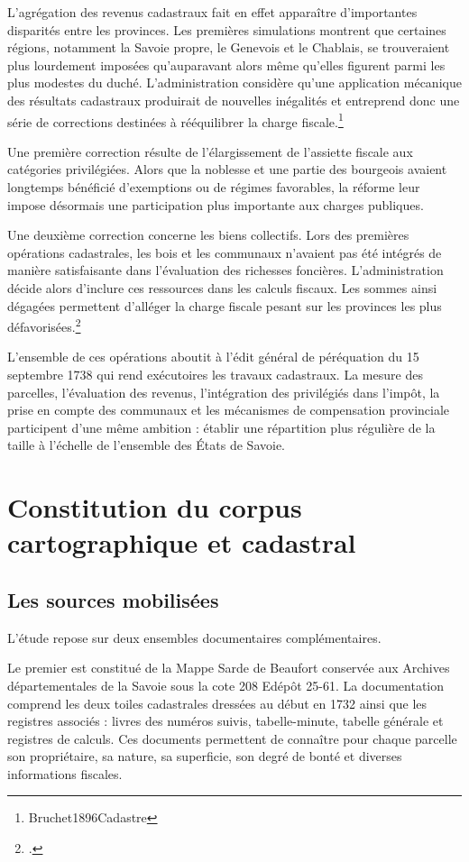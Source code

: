 \documentclass[12pt,a4paper]{report}
\begin{document}
L'agrégation des revenus cadastraux fait en effet apparaître d'importantes disparités entre les provinces. Les premières simulations montrent que certaines régions, notamment la Savoie propre, le Genevois et le Chablais, se trouveraient plus lourdement imposées qu'auparavant alors même qu'elles figurent parmi les plus modestes du duché. L'administration considère qu'une application mécanique des résultats cadastraux produirait de nouvelles inégalités et entreprend donc une série de corrections destinées à rééquilibrer la charge fiscale.\footnote{Bruchet1896Cadastre}

Une première correction résulte de l'élargissement de l'assiette fiscale aux catégories privilégiées. Alors que la noblesse et une partie des bourgeois avaient longtemps bénéficié d'exemptions ou de régimes favorables, la réforme leur impose désormais une participation plus importante aux charges publiques. 

Une deuxième correction concerne les biens collectifs. Lors des premières opérations cadastrales, les bois et les communaux n'avaient pas été intégrés de manière satisfaisante dans l'évaluation des richesses foncières. L'administration décide alors d'inclure ces ressources dans les calculs fiscaux. Les sommes ainsi dégagées permettent d'alléger la charge fiscale pesant sur les provinces les plus défavorisées.\footcite{Bruchet1896Cadastre}

L'ensemble de ces opérations aboutit à l'édit général de péréquation du 15 septembre 1738 qui rend exécutoires les travaux cadastraux. La mesure des parcelles, l'évaluation des revenus, l'intégration des privilégiés dans l'impôt, la prise en compte des communaux et les mécanismes de compensation provinciale participent d'une même ambition : établir une répartition plus régulière de la taille à l'échelle de l'ensemble des États de Savoie.
	
\chapter{Constitution du corpus cartographique et cadastral}


\section{Les sources mobilisées}

L'étude repose sur deux ensembles documentaires complémentaires.

Le premier est constitué de la Mappe Sarde de Beaufort conservée aux Archives départementales de la Savoie sous la cote 208 Edépôt 25-61. La documentation comprend les deux toiles cadastrales dressées au début en 1732 ainsi que les registres associés : livres des numéros suivis, tabelle-minute, tabelle générale et registres de calculs. Ces documents permettent de connaître pour chaque parcelle son propriétaire, sa nature, sa superficie, son degré de bonté et diverses informations fiscales.
\end{document}
